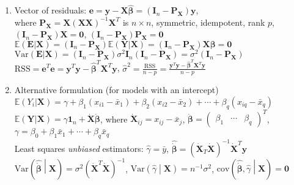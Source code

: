 \documentclass[11pt,a4paper]{article}
\begin{document}
\begin{enumerate}
\item Vector of residuals: $\mathbf{e} = \mathbf{y} - \mathbf{X} \hat{\boldsymbol \beta} = (\mathbf{I}_n - \mathbf{P}_{\mathbf{X}}) \mathbf{y}$, \\
where $\mathbf{P}_{\mathbf{X}} = \mathbf{X} (\mathbf{X} \mathbf{X})^{-1} \mathbf{X}^T$ is $n \times n$, symmetric, idempotent, rank $p$, \\
$(\mathbf{I}_n - \mathbf{P}_{\mathbf{X}}) \mathbf{X} = \mathbf{0}$, $(\mathbf{I}_n - \mathbf{P}_{\mathbf{X}}) \mathbf{P}_{\mathbf{X}} = \mathbf{0}$ \\
$\mathbb{E} (\mathbf{E} | \mathbf{X}) = (\mathbf{I}_n - \mathbf{P}_{\mathbf{X}}) \mathbb{E} (\mathbf{Y} | \mathbf{X}) = (\mathbf{I}_n - \mathbf{P}_{\mathbf{X}}) \mathbf{X} \boldsymbol \beta = \mathbf{0}$ \\
$\mathrm{Var} (\mathbf{E} | \mathbf{X}) = (\mathbf{I}_n - \mathbf{P}_{\mathbf{X}}) \sigma^2 \mathbf{I}_n (\mathbf{I}_n - \mathbf{P}_{\mathbf{X}}) = \sigma^2 (\mathbf{I}_n - \mathbf{P}_{\mathbf{X}})$ \\
$\mathrm{RSS} = \mathbf{e}^T \mathbf{e} = \mathbf{y}^T \mathbf{y} - \hat{\boldsymbol \beta}^T \mathbf{X}^T \mathbf{y}$, $\displaystyle \hat{\sigma}^2 = \frac{\mathrm{RSS}}{n-p} = \frac{\mathbf{y}^T \mathbf{y} - \hat{\boldsymbol \beta}^T \mathbf{X}^T \mathbf{y}}{n-p}$

\item Alternative formulation (for models with an intercept) \\
$\mathbb{E} (Y_i | \mathbf{X}) = \gamma + \beta_1 (x_{i1} - \bar{x}_1) + \beta_2 (x_{i2} - \bar{x}_2) + \cdots + \beta_q (x_{iq} - \bar{x}_q)$ \\
$\mathbb{E} (\mathbf{Y} | \mathbf{X}) = \gamma \mathbf{1}_n + \dot{\mathbf{X}} \dot{\boldsymbol \beta}$, where $\dot{\mathbf{X}}_{ij} = x_{ij} - \bar{x}_j$, $\dot{\boldsymbol \beta} = \begin{pmatrix}
\beta_1 & \cdots & \beta_q
\end{pmatrix}^T$, $\gamma = \beta_0 + \beta_1 \bar{x}_1 + \cdots + \beta_q \bar{x}_q$ \\
Least squares \emph{unbiased} estimators: $\hat{\gamma} = \bar{y}$, $\hat{\dot{\boldsymbol \beta}} = \left( \dot{\mathbf{X}}_T \dot{\mathbf{X}} \right)^{-1} \dot{\mathbf{X}}^T \mathbf{y}$ \\
$\mathrm{Var} \left( \hat{\dot{\boldsymbol \beta}} \middle| \mathbf{X} \right) = \sigma^2 \left( \dot{\mathbf{X}}^T \dot{\mathbf{X}} \right)^{-1}$, $\mathrm{Var} \left( \hat{\gamma} \middle| \mathbf{X} \right) = n^{-1} \sigma^2$, $\mathrm{cov} \left( \hat{\dot{\boldsymbol \beta}}, \hat{\gamma} \middle| \mathbf{X} \right) = \mathbf{0}$


\end{enumerate}
\end{document}
